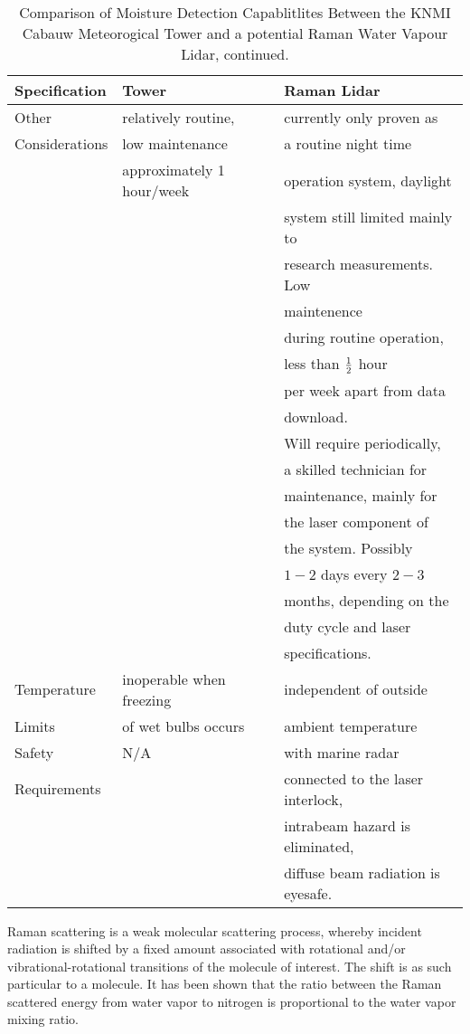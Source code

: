 \begin{table}
\caption{Comparison of Moisture Detection Capablitlites Between the KNMI
Cabauw Meteorogical Tower and a potential Raman Water Vapour Lidar,
continued.}
\begin{center}
\begin{tabular}{|l||l|l|}
\hline
Specification &	Tower &	Raman Lidar \\
\hline
\hline
Other & relatively routine,& 
currently only proven as\\
Considerations & low maintenance & a routine night time\\ 
& approximately  1 hour/week & 
operation system, daylight \\
&& system still limited mainly to \\ 
&& research measurements. Low \\ 
&& maintenence \\
&& during routine operation,\\ 
&& less than $1\over{2}$ hour\\
&& per week apart from data\\ 
&& download.\\ 
&& Will require periodically,\\ 
&& a skilled technician for \\ 
&& maintenance, mainly for \\ 
&& the laser component of \\ 
&& the system. Possibly \\
&& $1-2$ days every $2-3$\\ 
&& months, depending on the \\
&& duty cycle and laser\\ 
&& specifications.\\
\hline
Temperature & inoperable when freezing
& independent of outside \\
Limits & of wet bulbs occurs & ambient temperature \\
\hline
Safety & N/A & with marine radar \\
Requirements & & connected to the laser interlock,\\ 
&& intrabeam hazard is eliminated, \\
&& diffuse beam radiation is eyesafe.\\
\hline
\end{tabular}
\end{center}
\end{table}

Raman scattering is a weak molecular scattering process, whereby 
incident radiation is shifted by a fixed amount associated with 
rotational and/or vibrational-rotational transitions of the molecule of 
interest. The shift is as such particular to a molecule. It has been 
shown that the ratio between the Raman scattered energy from water 
vapor to nitrogen is proportional to the water vapor mixing ratio.

